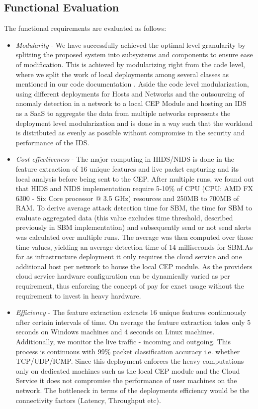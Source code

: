 \documentclass[conference]{sig-alternate-05-2015}
\begin{document}
\subsection{Functional Evaluation}
The functional requirements are evaluated as follows:
\begin{itemize}
  \item \textit{Modularity} - We have successfully achieved the optimal level granularity by splitting the proposed system into subsystems and components to ensure ease of modification. This is achieved by modularizing right from the code level, where we split the work of local deployments among several classes as mentioned in our code documentation \cite{javadoc1,javadoc2}. Aside the code level modularization, using different deployments for Hosts and Networks and the outsourcing of anomaly detection in a network to a local CEP Module and hosting an IDS as a SaaS to aggregate the data from multiple networks represents the deployment level modularization and is done in a way such that the workload is distributed as evenly as possible without compromise in the security and performance of the IDS.
  \item \textit{Cost effectiveness} - The major computing in HIDS/NIDS is done in the feature extraction of 16 unique features and live packet capturing and its local analysis before being sent to the CEP. After multiple runs, we found out that HIDS and NIDS implementation require 5-10\% of CPU (CPU: AMD FX 6300 - Six Core processor @ 3.5 GHz) resources and 250MB to 700MB of RAM. To derive average attack detection time for SBM, the time for SBM to evaluate aggregated data (this value excludes time threshold, described previously in SBM implementation) and subsequently send or not send alerts was calculated over multiple runs. The average was then computed over those time values, yielding an average detection time of 14 milliseconds for SBM.As far as infrastructure deployment it only requires the cloud service and one additional host per network to house the local CEP module. As the providers cloud service hardware configuration can be dynamically varied as per requirement, thus enforcing the concept of pay for exact usage without the requirement to invest in heavy hardware.
  \item \textit{Efficiency} - The feature extraction extracts 16 unique features continuously after certain intervals of time. On average the feature extraction takes only 5 seconds on Windows machines and 4 seconds on Linux machines. Additionally, we monitor the live traffic - incoming and outgoing. This process is continuous with 99\% packet classification accuracy i.e. whether TCP/UDP/ICMP. Since this deployment enforces the heavy computations only on dedicated machines such as the local CEP module and the Cloud Service it does not compromise the performance of user machines on the network. The bottleneck in terms of the deployments efficiency would be the connectivity factors (Latency, Throughput etc).

\end{itemize}
\end{document}
